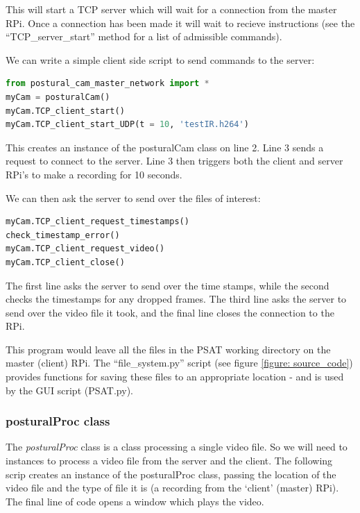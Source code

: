 \documentclass[12pt,a4paper]{report}
\begin{document}
	 This will start a TCP server which will wait for a connection from the master RPi. Once a connection has been made it will wait to recieve instructions (see the ``TCP\_server\_start'' method for a list of admissible commands). 
	 
	 We can write a simple client side script to send commands to the server:	 
	 
	 \begin{lstlisting}[language=Python]
from postural_cam_master_network import *
myCam = posturalCam()    
myCam.TCP_client_start()	 
myCam.TCP_client_start_UDP(t = 10, 'testIR.h264') 
	 \end{lstlisting}

	 \noindent This creates an instance of the posturalCam class on line 2. Line 3 sends a request to connect to the server. Line 3 then triggers both the client and server RPi's to make a recording for 10 seconds.
	  
	 We can then ask the server to send over the files of interest: 
	 
	 \begin{lstlisting}[language=Python]
myCam.TCP_client_request_timestamps() 
check_timestamp_error()
myCam.TCP_client_request_video()   
myCam.TCP_client_close()
	 \end{lstlisting}

	 
	 \noindent The first line asks the server to send over the time stamps, while the second checks the timestamps for any dropped frames. The third line asks the server to send over the video file it took, and the final line closes the connection to the RPi.
	 
	 This program would leave all the files in the PSAT working directory on the master (client) RPi. The ``file\_system.py'' script (see figure \ref*{figure: source_code}) provides functions for saving these files to an appropriate location - and is used by the GUI script (PSAT.py).
	 
	 \subsubsection{posturalProc class}
	 
	 The \textit{posturalProc} class is a class processing a single video file. So we will need to instances to process a video file from the server and the client. The following scrip creates an instance of the posturalProc class, passing the location of the video file and the type of file it is (a recording from the `client' (master) RPi). The final line of code opens a window which plays the video.
	 
\end{document}
